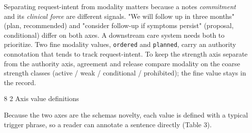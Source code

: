 \documentclass[3p,twocolumn]{elsarticle}
\makeatletter
\renewcommand\subsection{\@startsection{subsection}{2}{\z@}%
    {8\p@ \@plus 4\p@ \@minus 4\p@}%
    {2\p@ \@plus 4\p@ \@minus 3\p@}%
    {\normalfont\normalsize\itshape}}
\makeatother
\begin{document}
Separating request-intent from modality matters because a note\textquotesingle s \emph{commitment} and its \emph{clinical force} are different signals. "We will follow up in three months" (plan, recommended) and "consider follow-up if symptoms persist" (proposal, conditional) differ on both axes. A downstream care system needs both to prioritize. Two fine modality values, \texttt{ordered} and \texttt{planned}, carry an authority connotation that tends to track request-intent. To keep the strength axis separate from the authority axis, agreement and release compare modality on the coarse strength classes (active / weak / conditional / prohibited); the fine value stays in the record.

\subsection{Axis value definitions}\label{axis-value-definitions}

Because the two axes are the schema\textquotesingle s novelty, each value is defined with a typical trigger phrase, so a reader can annotate a sentence directly (Table 3).
\end{document}
